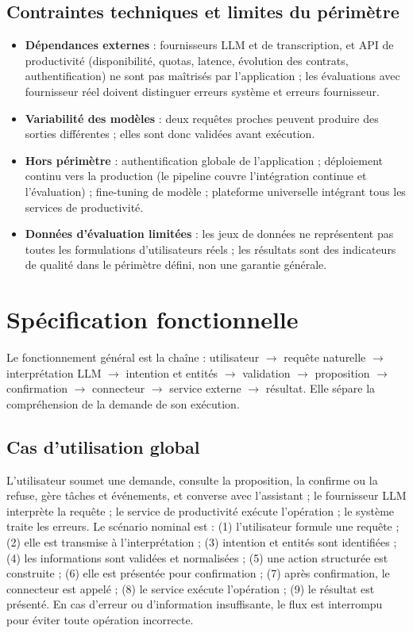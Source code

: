 \documentclass[11pt,a4paper,openany,oneside]{report}
\begin{document}
\subsection{Contraintes techniques et limites du périmètre}
\begin{itemize}
\item \textbf{Dépendances externes} : fournisseurs LLM et de transcription, et API de productivité (disponibilité, quotas, latence, évolution des contrats, authentification) ne sont pas maîtrisés par l'application ; les évaluations avec fournisseur réel doivent distinguer erreurs système et erreurs fournisseur.
\item \textbf{Variabilité des modèles} : deux requêtes proches peuvent produire des sorties différentes ; elles sont donc validées avant exécution.
\item \textbf{Hors périmètre} : authentification globale de l'application ; déploiement continu vers la production (le pipeline couvre l'intégration continue et l'évaluation) ; fine-tuning de modèle ; plateforme universelle intégrant tous les services de productivité.
\item \textbf{Données d'évaluation limitées} : les jeux de données ne représentent pas toutes les formulations d'utilisateurs réels ; les résultats sont des indicateurs de qualité dans le périmètre défini, non une garantie générale.
\end{itemize}

\section{Spécification fonctionnelle}
Le fonctionnement général est la chaîne : utilisateur $\rightarrow$ requête naturelle $\rightarrow$ interprétation LLM $\rightarrow$ intention et entités $\rightarrow$ validation $\rightarrow$ proposition $\rightarrow$ confirmation $\rightarrow$ connecteur $\rightarrow$ service externe $\rightarrow$ résultat. Elle sépare la compréhension de la demande de son exécution.

\subsection{Cas d'utilisation global}
L'utilisateur soumet une demande, consulte la proposition, la confirme ou la refuse, gère tâches et événements, et converse avec l'assistant ; le fournisseur LLM interprète la requête ; le service de productivité exécute l'opération ; le système traite les erreurs. Le scénario nominal est : (1) l'utilisateur formule une requête ; (2) elle est transmise à l'interprétation ; (3) intention et entités sont identifiées ; (4) les informations sont validées et normalisées ; (5) une action structurée est construite ; (6) elle est présentée pour confirmation ; (7) après confirmation, le connecteur est appelé ; (8) le service exécute l'opération ; (9) le résultat est présenté. En cas d'erreur ou d'information insuffisante, le flux est interrompu pour éviter toute opération incorrecte.
\end{document}
